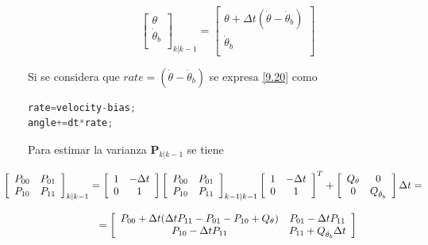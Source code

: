 \documentclass[twoside,11pt]{book}
\begin{document}
\begin{equation}
\left[ \begin{array}{c}
\theta \\
\dot{\theta}_{b} \\ \end{array} \right]_{k|k-1} = \left[ \begin{array}{c}
\theta + \Delta t(\dot{\theta}-\dot{\theta}_{b}) \\
\dot{\theta}_{b} \\ \end{array} \right]
\label{9.20}
\end{equation}

Si se considera que $rate=(\dot{\theta}-\dot{\theta}_{b})$ se expresa \ref{9.20} como 

\begin{lstlisting}[language=C]   
rate=velocity-bias;
angle+=dt*rate;
\end{lstlisting}

Para estimar la varianza $\mathbf{P}_{k|k-1}$ se tiene 

\begin{equation}
\begin{array}{c}

\hspace{-1cm} \left[ \begin{array}{cc}
P_{00} & P_{01} \\
P_{10} & P_{11} \\ \end{array} \right]_{k|k-1} = \left[ \begin{array}{cc}
1 & -\Delta t \\
0 & 1 \\ \end{array} \right] \left[ \begin{array}{cc}
P_{00} & P_{01} \\
P_{10} & P_{11} \\ \end{array} \right]_{k-1|k-1} \left[ \begin{array}{cc}
1 & -\Delta t \\
0 & 1 \\ \end{array} \right]^{T} + \left[ \begin{array}{cc}
Q_{\theta} & 0 \\
0 & Q_{\dot{\theta}_{b}} \\ \end{array} \right] \Delta t = \\
\\
= \left[ \begin{array}{cc}
P_{00} + \Delta t (\Delta t P_{11} - P_{01} - P_{10} + Q_{\theta}) & P_{01} - \Delta t P_{11} \\
P_{10} - \Delta t P_{11} & P_{11}+ Q_{\dot{\theta}_{b}}\Delta t \\ \end{array} \right]
\end{array}
\end{equation}
\end{document}
